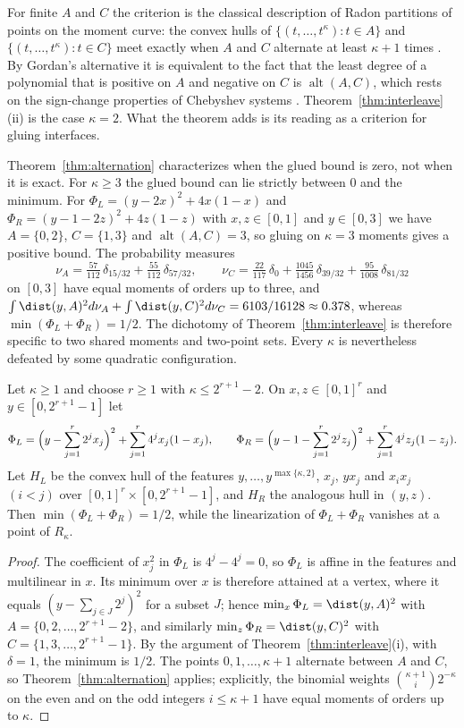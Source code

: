 For finite $A$ and $C$ the criterion is the classical description of Radon
partitions of points on the moment curve: the convex hulls of
$\{(t,\dots,t^\kappa):t\in A\}$ and $\{(t,\dots,t^\kappa):t\in C\}$ meet
exactly when $A$ and $C$ alternate at least $\kappa+1$ times
\citep{Breen1973}. By Gordan's alternative it is equivalent to the fact that
the least degree of a polynomial that is positive on $A$ and negative on $C$
is $\operatorname{alt}(A,C)$, which rests on the sign-change properties of
Chebyshev systems \citep{KarlinStudden1966}. Theorem~\ref{thm:interleave}(ii)
is the case $\kappa=2$. What the theorem adds is its reading as a criterion
for gluing interfaces.

Theorem~\ref{thm:alternation} characterizes when the glued bound is zero,
not when it is exact. For $\kappa\ge3$ the glued bound can lie strictly
between $0$ and the minimum. For $\Phi_L=(y-2x)^2+4x(1-x)$ and
$\Phi_R=(y-1-2z)^2+4z(1-z)$ with $x,z\in[0,1]$ and $y\in[0,3]$ we have
$A=\{0,2\}$, $C=\{1,3\}$ and $\operatorname{alt}(A,C)=3$, so gluing on
$\kappa=3$ moments gives a positive bound. The probability measures
\[
\nu_A=\tfrac{57}{112}\,\delta_{15/32}+\tfrac{55}{112}\,\delta_{57/32},\qquad
\nu_C=\tfrac{22}{117}\,\delta_{0}+\tfrac{1045}{1456}\,\delta_{39/32}+\tfrac{95}{1008}\,\delta_{81/32}
\]
on $[0,3]$ have equal moments of orders up to three, and
$\int\dist(y,A)^2d\nu_A+\int\dist(y,C)^2d\nu_C=6103/16128\approx0.378$,
whereas $\min(\Phi_L+\Phi_R)=1/2$. The dichotomy of
Theorem~\ref{thm:interleave} is therefore specific to two shared moments and
two-point sets. Every $\kappa$ is nevertheless defeated by some quadratic
configuration.

\begin{proposition}\label{prop:full-gap}
Let $\kappa\ge1$ and choose $r\ge1$ with $\kappa\le2^{r+1}-2$. On
$x,z\in[0,1]^r$ and $y\in[0,2^{r+1}-1]$ let
\[
\Phi_L=\Bigl(y-\sum_{j=1}^r2^jx_j\Bigr)^2+\sum_{j=1}^r4^jx_j(1-x_j),\qquad
\Phi_R=\Bigl(y-1-\sum_{j=1}^r2^jz_j\Bigr)^2+\sum_{j=1}^r4^jz_j(1-z_j).
\]
Let $H_L$ be the convex hull of the features $y,\dots,y^{\max\{\kappa,2\}}$,
$x_j$, $yx_j$ and $x_ix_j$ $(i<j)$ over $[0,1]^r\times[0,2^{r+1}-1]$, and $H_R$
the analogous hull in $(y,z)$. Then $\min(\Phi_L+\Phi_R)=1/2$, while the
linearization of $\Phi_L+\Phi_R$ vanishes at a point of $R_\kappa$.
\end{proposition}

\begin{proof}
The coefficient of $x_j^2$ in $\Phi_L$ is $4^j-4^j=0$, so $\Phi_L$ is affine
in the features and multilinear in $x$. Its minimum over $x$ is therefore
attained at a vertex, where it equals $(y-\sum_{j\in J}2^j)^2$ for a subset
$J$; hence $\min_x\Phi_L=\dist(y,A)^2$ with $A=\{0,2,\dots,2^{r+1}-2\}$, and
similarly $\min_z\Phi_R=\dist(y,C)^2$ with $C=\{1,3,\dots,2^{r+1}-1\}$. By the
argument of Theorem~\ref{thm:interleave}(i), with $\delta=1$, the minimum is
$1/2$. The points $0,1,\dots,\kappa+1$ alternate between $A$ and $C$, so
Theorem~\ref{thm:alternation} applies; explicitly, the binomial weights
$\binom{\kappa+1}i2^{-\kappa}$ on the even and on the odd integers
$i\le\kappa+1$ have equal moments of orders up to $\kappa$.
\end{proof}

